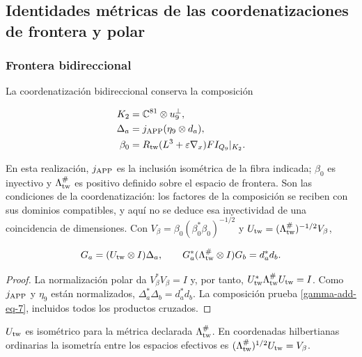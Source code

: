 \subsection{Identidades métricas de las coordenatizaciones de frontera y polar}
\label{gamma-add-sub-195}

\subsubsection{Frontera bidireccional}
\label{gamma-add-sub-197}

La coordenatización bidireccional conserva la composición

\begin{equation}
\begin{aligned}
K_2&=\mathbb C^{81}\otimes u_9^\perp,\\
\Delta_a&=j_{\rm APP}(\eta_9\otimes d_a),\\
\beta_0&=R_{\rm tw}(L^3+\varepsilon\nabla_x)FI_{Q_9}|_{K_2}.
\end{aligned}
\label{gamma-add-display-16}
\end{equation}

En esta realización, \(j_{\rm APP}\) es la inclusión isométrica
de la fibra indicada; \(\beta_0\) es inyectivo y
\(\Lambda_{\rm tw}^{\#}\) es positivo definido sobre el espacio
de frontera. Son las condiciones de la coordenatización: los factores de la
composición se reciben con sus dominios compatibles, y aquí no se
deduce esa inyectividad de una coincidencia de dimensiones.
Con \(V_\beta=\beta_0(\beta_0^*\beta_0)^{-1/2}\) y
\(U_{\rm tw}=(\Lambda_{\rm tw}^{\#})^{-1/2}V_\beta\),

\begin{equation}
G_a=(U_{\rm tw}\otimes I)\Delta_a,\qquad
G_a^*(\Lambda_{\rm tw}^{\#}\otimes I)G_b=d_a^*d_b.
\label{gamma-add-eq-7}
\end{equation}

\begin{proof}
La normalización polar da \(V_\beta^*V_\beta=I\) y, por tanto,
\(U_{\rm tw}^*\Lambda_{\rm tw}^{\#}U_{\rm tw}=I\).
Como \(j_{\rm APP}\) y \(\eta_9\) están normalizados,
\(\Delta_a^*\Delta_b=d_a^*d_b\). La composición prueba
\eqref{gamma-add-eq-7}, incluidos todos los productos cruzados.
\end{proof}
\(U_{\rm tw}\) es isométrico para la métrica declarada
\(\Lambda_{\rm tw}^{\#}\). En coordenadas hilbertianas ordinarias
la isometría entre los espacios efectivos es
\((\Lambda_{\rm tw}^{\#})^{1/2}U_{\rm tw}=V_\beta\).

